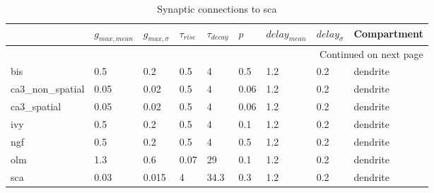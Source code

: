 \begin{longtable}{lllllllll}
\caption{Synaptic connections to sca}\label{sca_synapses}\\
\toprule
{} &  $g_{max, mean}$ & $g_{max, \sigma}$ & $\tau_{rise}$ & $\tau_{decay}$ &  $p$ & $delay_{mean}$ & $delay_{\sigma}$ & Compartment \\
\midrule
\endhead
\midrule
\multicolumn{9}{r}{{Continued on next page}} \\
\midrule
\endfoot

\bottomrule
\endlastfoot
bis             &   0.5 &      0.2 &      0.5 &         4 &   0.5 &   1.2 &       0.2 &      dendrite\ \\
ca3\_non\_spatial &  0.05 &     0.02 &      0.5 &         4 &  0.06 &   1.2 &       0.2 &      dendrite\ \\
ca3\_spatial     &  0.05 &     0.02 &      0.5 &         4 &  0.06 &   1.2 &       0.2 &      dendrite\ \\
ivy             &   0.5 &      0.2 &      0.5 &         4 &   0.1 &   1.2 &       0.2 &      dendrite\ \\
ngf             &   0.5 &      0.2 &      0.5 &         4 &   0.5 &   1.2 &       0.2 &      dendrite\ \\
olm             &   1.3 &      0.6 &     0.07 &        29 &   0.1 &   1.2 &       0.2 &      dendrite\ \\
sca             &  0.03 &    0.015 &        4 &      34.3 &   0.3 &   1.2 &       0.2 &      dendrite\ \\
\end{longtable}
